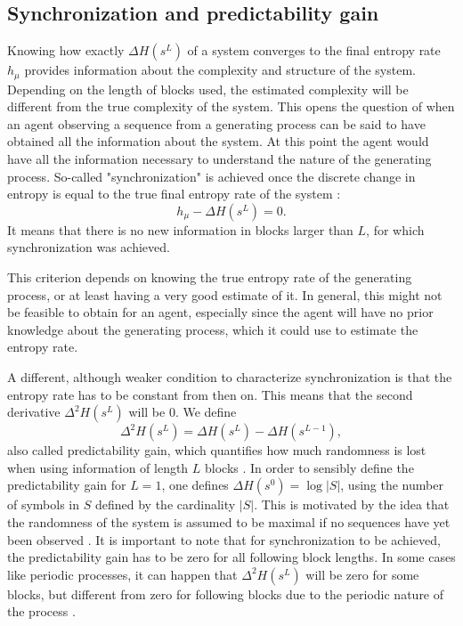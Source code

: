 \documentclass[12pt,a4paper]{article}
\begin{document}
\subsection{Synchronization and predictability gain} \label{ssec:synch_predgain}
Knowing how exactly $\Delta H(s^L)$ of a system converges to the final entropy rate $h_\mu$ provides information about the complexity and structure of the system.
Depending on the length of blocks used, the estimated complexity will be different from the true complexity of the system.
This opens the question of when an agent observing a sequence from a generating process can be said to have obtained all the information about the system.
At this point the agent would have all the information necessary to understand the nature of the generating process.
So-called "synchronization" is achieved once the discrete change in entropy is equal to the true final entropy rate of the system \autocite{crutchfield2003regularities}:
\begin{equation}
    \label{eq:synchronisation_equality}
    h_\mu - \Delta H(s^L) = 0.
\end{equation}
It means that there is no new information in blocks larger than $L$, for which synchronization was achieved.

This criterion depends on knowing the true entropy rate of the generating process, or at least having a very good estimate of it.
In general, this might not be feasible to obtain for an agent, especially since the agent will have no prior knowledge about the generating process, which it could use to estimate the entropy rate.

A different, although weaker condition to characterize synchronization is that the entropy rate has to be constant from then on.
This means that the second derivative $\Delta^2 H(s^L)$ will be 0.
We define
\begin{equation}
    \label{eq:predictability_gain}
    \Delta^2 H(s^L) = \Delta H(s^L) - \Delta H(s^{L-1}),
\end{equation}
also called predictability gain, which quantifies how much randomness is lost when using information of length $L$ blocks \autocite{crutchfield2003regularities}.
In order to sensibly define the predictability gain for $L=1$, one defines $\Delta H(s^0) = \log |S|$, using the number of symbols in $S$ defined by the cardinality $|S|$.
This is motivated by the idea that the randomness of the system is assumed to be maximal if no sequences have yet been observed \autocite{crutchfield2003regularities}.
It is important to note that for synchronization to be achieved, the predictability gain has to be zero for all following block lengths.
In some cases like periodic processes, it can happen that $\Delta^2 H(s^L)$ will be zero for some blocks, but different from zero for following blocks due to the periodic nature of the process \autocite{crutchfield2003regularities}.
\end{document}
